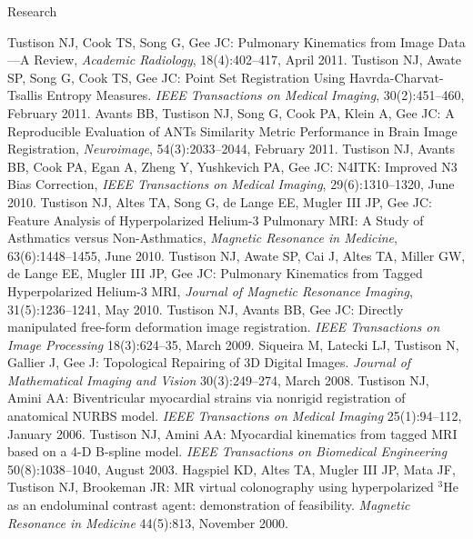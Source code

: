 \documentclass{resume}
\begin{document}
\begin{category}{Research}
\begin{itemize}
    \citemnobullet Tustison NJ, Cook TS, Song G, Gee JC:  Pulmonary Kinematics from Image Data---A Review, {\em Academic Radiology}, 18(4):402--417, April 2011.
    \citemnobullet Tustison NJ, Awate SP, Song G, Cook TS, Gee JC:  Point Set Registration Using Havrda-Charvat-Tsallis Entropy Measures. {\em IEEE Transactions on Medical Imaging}, 30(2):451--460, February 2011.
    \citemnobullet Avants BB, Tustison NJ, Song G, Cook PA, Klein A, Gee JC:  A Reproducible Evaluation of ANTs Similarity Metric Performance in Brain Image Registration, {\em Neuroimage}, 54(3):2033--2044, February 2011.
    \citemnobullet Tustison NJ, Avants BB, Cook PA, Egan A, Zheng Y, Yushkevich PA, Gee JC:  N4ITK:  Improved N3 Bias Correction, {\em IEEE Transactions on Medical Imaging}, 29(6):1310--1320, June 2010.
    \citemnobullet Tustison NJ, Altes TA, Song G, de Lange EE, Mugler III JP, Gee JC:  Feature Analysis of Hyperpolarized Helium-3 Pulmonary MRI:  A Study of Asthmatics versus Non-Asthmatics, {\em Magnetic Resonance in Medicine}, 63(6):1448--1455, June 2010.
    \citemnobullet Tustison NJ, Awate SP, Cai J, Altes TA, Miller GW, de Lange EE, Mugler III JP, Gee JC:  Pulmonary Kinematics from Tagged Hyperpolarized Helium-3 MRI, {\em Journal of Magnetic Resonance Imaging}, 31(5):1236--1241, May 2010.
    \citemnobullet Tustison NJ, Avants BB, Gee JC: Directly manipulated free-form deformation image registration. {\em IEEE Transactions on Image Processing} 18(3):624--35, March 2009.
    \citemnobullet Siqueira M, Latecki LJ, Tustison N, Gallier J, Gee J: Topological Repairing of 3D Digital Images. {\em Journal of Mathematical Imaging and Vision} 30(3):249--274, March 2008.
    \citemnobullet Tustison NJ, Amini AA: Biventricular myocardial strains via nonrigid registration of anatomical NURBS model. {\em IEEE Transactions on Medical Imaging} 25(1):94--112, January 2006.
    \citemnobullet Tustison NJ, Amini AA: Myocardial kinematics from tagged MRI based on a 4-D B-spline model. {\em IEEE Transactions on Biomedical Engineering} 50(8):1038--1040, August 2003.
    \citemnobullet Hagspiel KD, Altes TA, Mugler III JP, Mata JF, Tustison NJ, Brookeman JR: MR virtual colonography using hyperpolarized $^3$He as an endoluminal contrast agent: demonstration of feasibility. {\em Magnetic Resonance in Medicine} 44(5):813, November 2000.
   \end{itemize}



\end{category}
\end{document}

